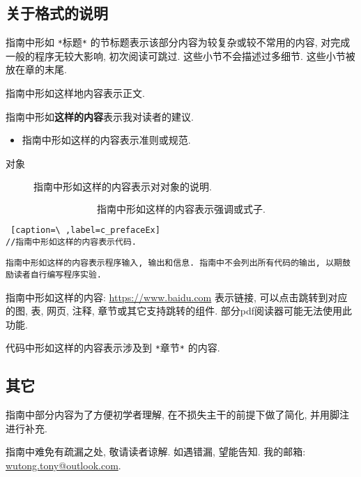     \vspace*{5pt}

    \subsection*{关于格式的说明}

    指南中形如 \texttt{*}标题\texttt{*} 的节标题表示该部分内容为较复杂或较不常用的内容, 对完成一般的程序无较大影响, 初次阅读可跳过. 这些小节不会描述过多细节. 这些小节被放在章的末尾.

    \vspace*{5pt}
    指南中形如这样地内容表示正文. 

    \vspace*{5pt}
    指南中形如\textbf{这样的内容}表示我对读者的建议.

    \begin{itemize}
        \item 指南中形如这样的内容表示准则或规范.
    \end{itemize}

    \begin{description}
        \item[对象] 指南中形如这样的内容表示对对象的说明. 
    \end{description}

    \vspace*{-20pt}
        \[ \mbox{指南中形如这样的内容表示强调或式子.} \]

\begin{lstlisting} [caption=\ ,label=c_prefaceEx]
//指南中形如这样的内容表示代码.
\end{lstlisting}


\begin{lstlisting}
指南中形如这样的内容表示程序输入, 输出和信息. 指南中不会列出所有代码的输出, 以期鼓励读者自行编写程序实验.
\end{lstlisting}

    \vspace*{5pt}
    指南中形如这样的内容: \href{https://www.baidu.com}{https://www.baidu.com} 表示链接, 可以点击跳转到对应的图, 表, 网页, 注释, 章节或其它支持跳转的组件. 部分pdf阅读器可能无法使用此功能.

    \begin{mdframed}[linecolor=darkgray]
        代码中形如这样的内容表示涉及到 \texttt{*}章节\texttt{*} 的内容.
    \end{mdframed}

    \subsection*{其它}

    指南中部分内容为了方便初学者理解, 在不损失主干的前提下做了简化, 并用脚注进行补充.

    指南中难免有疏漏之处, 敬请读者谅解. 如遇错漏, 望能告知. 我的邮箱: \mbox{\href{mailto: wutong.tony@outlook.com}{wutong.tony@outlook.com}}.